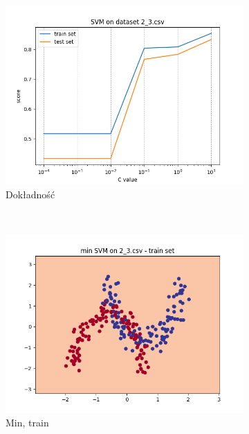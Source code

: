 \documentclass[12pt]{article}
\newcommand*{\subfigwidth}{0.24\textwidth}
\begin{document}
\begin{figure}[H]\centering
    \begin{subfigure}[t]{\subfigwidth}
        \includegraphics[width=\linewidth]{img/exp_2/svm/2_3/accuracy.png}
        \caption{Dokładność}
    \end{subfigure}
    \\
    \begin{subfigure}[t]{\subfigwidth}
        \includegraphics[width=\linewidth]{img/exp_2/svm/2_3/min/train_boundary.png}
        \caption{Min, train}
    \end{subfigure}
    \hfill
    \begin{subfigure}[t]{\subfigwidth}

\end{subfigure}
\end{figure}
\end{document}
